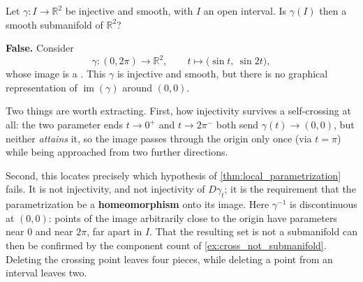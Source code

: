 \begin{question}
\label{q:quiz_q7}
Let $\gamma : I \to \mathbb{R}^2$ be injective and smooth, with $I$ an open interval. Is
$\gamma(I)$ then a smooth submanifold of $\mathbb{R}^2$?
\end{question}

\begin{answer}
\textbf{False.} Consider
\[\gamma : (0,2\pi) \to \mathbb{R}^2, \qquad t \mapsto \big(\sin t,\ \sin 2t\big),\]
whose image is a  . This $\gamma$ is injective and
smooth, but there is no graphical representation of $\operatorname{im}(\gamma)$ around $(0,0)$.
\end{answer}

\begin{center}
\end{center}

\begin{ainote}
Two things are worth extracting. First, how injectivity survives a self-crossing at all: the two
parameter ends $t \to 0^+$ and $t \to 2\pi^-$ both send $\gamma(t) \to (0,0)$, but neither
\emph{attains} it, so the image passes through the origin only once (via $t = \pi$) while
being approached from two further directions.

Second, this locates precisely which hypothesis of \cref{thm:local_parametrization} fails. It is
not injectivity, and not injectivity of $D\gamma_t$; it is the requirement that the
parametrization be a \textbf{homeomorphism} onto its image. Here $\gamma^{-1}$ is discontinuous
at $(0,0)$: points of the image arbitrarily close to the origin have parameters near $0$ and near
$2\pi$, far apart in $I$. That the resulting set is not a submanifold can then be confirmed by
the component count of \cref{ex:cross_not_submanifold}. Deleting the crossing point leaves
four pieces, while deleting a point from an interval leaves two.
\end{ainote}

